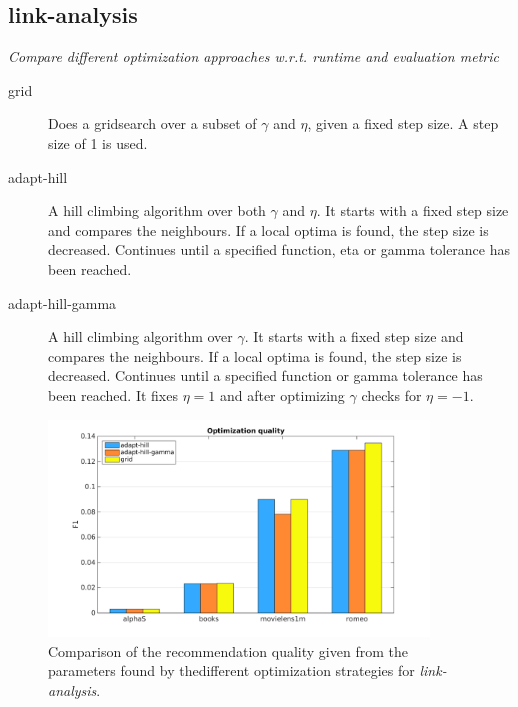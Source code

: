 
\subsection{link-analysis}\label{sec:tuning:link}

\textit{Compare different optimization approaches w.r.t. runtime and evaluation metric}

\begin{description}
    \item[grid]
        Does a gridsearch over a subset of $\gamma$ and $\eta$, given a fixed step size. A step size of 1 is used.
    \item[adapt-hill]
        A hill climbing algorithm over both $\gamma$ and $\eta$. It starts with a fixed step size and compares the neighbours. If a local optima is found, the step size is decreased. Continues until a specified function, eta or gamma tolerance has been reached.
    \item[adapt-hill-gamma]
        A hill climbing algorithm over $\gamma$. It starts with a fixed step size and compares the neighbours. If a local optima is found, the step size is decreased. Continues until a specified function or gamma tolerance has been reached. It fixes $\eta = 1$ and after optimizing $\gamma$ checks for $\eta = -1$.
\end{description}


\begin{figure}[h!]
    \centering
    \includegraphics[width=0.9\textwidth]{fig/comp/comp_link_quality.png}
    \caption{Comparison of the recommendation quality given from the parameters found by thedifferent optimization strategies for \textit{link-analysis}.}
\end{figure}

